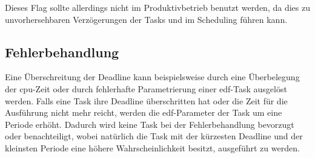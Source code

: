 \documentclass[../EDF Master Thesis.tex]{subfiles}
\begin{document}
    Dieses Flag sollte allerdings nicht im Produktivbetrieb benutzt werden, da dies zu unvorhersehbaren Verzögerungen der Tasks und im Scheduling führen kann.

\clearpage

\subsection{Fehlerbehandlung} \label{section:Fehlerbehandlung}

    Eine Überschreitung der Deadline kann beispielsweise durch eine Überbelegung der \ac{cpu}-Zeit oder durch fehlerhafte Parametrierung einer \ac{edf}-Task ausgelöst werden.
    Falls eine Task ihre Deadline überschritten hat oder die Zeit für die Ausführung nicht mehr reicht, werden die \ac{edf}-Parameter der Task um eine Periode erhöht.
    Dadurch wird keine Task bei der Fehlerbehandlung bevorzugt oder benachteiligt, wobei natürlich die Task mit der kürzesten Deadline und der kleinsten Periode eine höhere Wahrscheinlichkeit besitzt, ausgeführt zu werden. 
\end{document}
